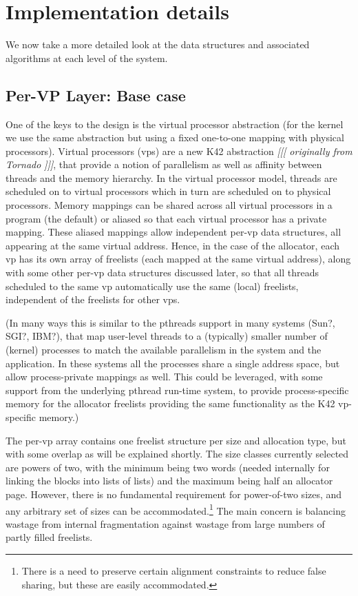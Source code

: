 \documentclass[dvips,11pt]{article}
\newcommand\fixnote[1]{\emph{[[[ #1 ]]]}}
\begin{document}
\section{Implementation details}

We now take a more detailed look at the data structures and associated
algorithms at each level of the system.


\subsection{Per-VP Layer: Base case}

One of the keys to the design is the virtual processor abstraction (for the
kernel we use the same abstraction but using a fixed one-to-one mapping
with physical processors).  Virtual processors (vps) are a new K42
abstraction \fixnote{originally from Tornado}, that provide a notion of
parallelism as well as affinity between threads and the memory hierarchy.
In the virtual processor model, threads are scheduled on to virtual
processors which in turn are scheduled on to physical processors.  Memory
mappings can be shared across all virtual processors in a program (the
default) or aliased so that each virtual processor has a private mapping.
These aliased mappings allow independent per-vp data structures, all
appearing at the same virtual address.  Hence, in the case of the
allocator, each vp has its own array of freelists (each mapped at the same
virtual address), along with some other per-vp data structures discussed
later, so that all threads scheduled to the same vp automatically use the
same (local) freelists, independent of the freelists for other vps.

(In many ways this is similar to the pthreads support in many systems
(Sun?, SGI?, IBM?), that map user-level threads to a (typically) smaller
number of (kernel) processes to match the available parallelism in the
system and the application.  In these systems all the processes share a
single address space, but allow process-private mappings as well.  This
could be leveraged, with some support from the underlying pthread run-time
system, to provide process-specific memory for the allocator freelists
providing the same functionality as the K42 vp-specific memory.)

The per-vp array contains one freelist structure per size and allocation
type, but with some overlap as will be explained shortly.  The size classes
currently selected are powers of two, with the minimum being two words
(needed internally for linking the blocks into lists of lists) and the
maximum being half an allocator page.  However, there is no fundamental
requirement for power-of-two sizes, and any arbitrary set of sizes can be
accommodated.\footnote{There is a need to preserve certain alignment
  constraints to reduce false sharing, but these are easily accommodated.}
The main concern is balancing wastage from internal fragmentation against
wastage from large numbers of partly filled freelists.
\end{document}
